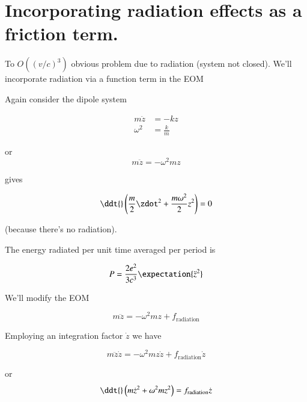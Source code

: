 \section{Incorporating radiation effects as a friction term.}

To $O((v/c)^3)$ obvious problem due to radiation (system not closed).  We'll incorporate radiation via a function term in the EOM

Again consider the dipole system

\begin{align}\label{eqn:relativisticElectrodynamicsL26:110}
m \ddot{z} &= -k z \\
\omega^2 &= \frac{k}{m}
\end{align}

or
\begin{equation}\label{eqn:relativisticElectrodynamicsL26:130}
m \ddot{z} = -\omega^2 m z
\end{equation}

gives

\begin{equation}\label{eqn:relativisticElectrodynamicsL26:150}
\ddt{}\left( \frac{m}{2} \zdot^2 + \frac{ m \omega^2 }{2} z^2 \right) = 0 
\end{equation}

(because there's no radiation).

The energy radiated per unit time averaged per period is

\begin{equation}\label{eqn:relativisticElectrodynamicsL26:170}
P = \frac{ 2 e^2 }{ 3 c^3} \expectation{ \ddot{z}^2 }
\end{equation}

We'll modify the EOM

\begin{equation}\label{eqn:relativisticElectrodynamicsL26:190}
m \ddot{z} = -\omega^2 m z + f_{\text{radiation}}
\end{equation}

Employing an integration factor $\dot{z}$ we have

\begin{equation}\label{eqn:relativisticElectrodynamicsL26:210}
m \ddot{z} \dot{z} = -\omega^2 m z \dot{z} + f_{\text{radiation}} \dot{z}
\end{equation}

or
\begin{equation}\label{eqn:relativisticElectrodynamicsL26:230}
\ddt{} 
\left( m \dot{z}^2 + \omega^2 m z^2 \right) 
= 
f_{\text{radiation}} \dot{z}
\end{equation}

